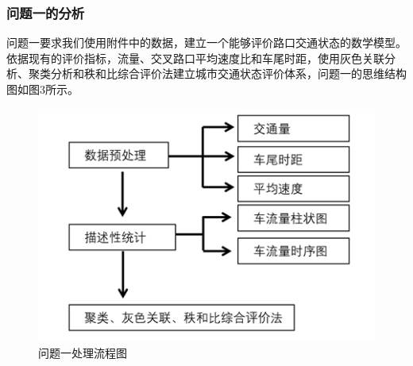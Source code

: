 \documentclass[UTF8]{article}
\begin{document}
    \subsubsection{问题一的分析}
     问题一要求我们使用附件中的数据，建立一个能够评价路口交通状态的数学模型。依据现有的评价指标，流量、交叉路口平均速度比和车尾时距，使用灰色关联分析、聚类分析和秩和比综合评价法建立城市交通状态评价体系，问题一的思维结构图如图3所示。\\
     \begin{figure}[H]
         \includegraphics[width=\linewidth]{2.png}
         \caption{问题一处理流程图}
     \end{figure}
\end{document}
